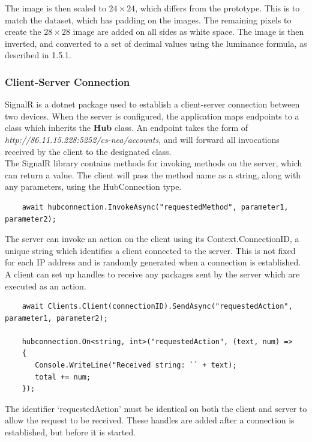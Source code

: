 \documentclass{article}
\begin{document}
The image is then scaled to \(24\times 24\), which differs from the prototype. This is to match the dataset, which has padding on the images. The remaining pixels to create the \(28\times 28\) image are added on all sides as white space. The image is then inverted, and converted to a set of decimal values using the luminance formula, as described in 1.5.1.

\subsubsection{Client-Server Connection}

SignalR is a dotnet package used to establish a client-server connection between two devices. When the server is configured, the application maps endpoints to a class which inherits the \textbf{Hub} class. An endpoint takes the form of \textit{http://86.11.15.228:5252/cs-nea/accounts}, and will forward all invocations received by the client to the designated class. \\

The SignalR library contains methods for invoking methods on the server, which can return a value. The client will pass the method name as a string, along with any parameters, using the HubConnection type.

\begin{verbatim}
    await hubconnection.InvokeAsync("requestedMethod", parameter1, parameter2);
\end{verbatim}

The server can invoke an action on the client using its Context.ConnectionID, a unique string which identifies a client connected to the server. This is not fixed for each IP address and is randomly generated when a connection is established. A client can set up handles to receive any packages sent by the server which are executed as an action.

\begin{verbatim}
    await Clients.Client(connectionID).SendAsync("requestedAction", parameter1, parameter2);
    
    hubconnection.On<string, int>("requestedAction", (text, num) =>
    {
       Console.WriteLine("Received string: `` + text);
       total += num;
    });
\end{verbatim}

The identifier `requestedAction' must be identical on both the client and server to allow the request to be received. These handles are added after a connection is established, but before it is started.
\end{document}
